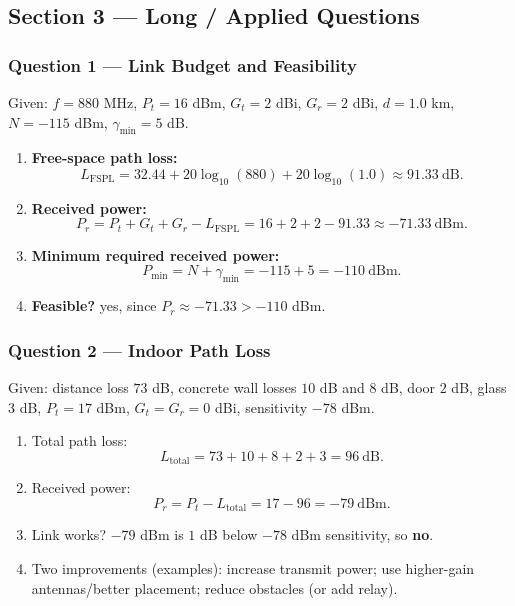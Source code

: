 \documentclass[11pt,a4paper]{article}
\begin{document}
\subsection*{Section 3 --- Long / Applied Questions}

\subsubsection*{Question 1 --- Link Budget and Feasibility}
Given: $f=880$ MHz, $P_t=16$ dBm, $G_t=2$ dBi, $G_r=2$ dBi, $d=1.0$ km, $N=-115$ dBm, $\gamma_{\min}=5$ dB.

\begin{enumerate}[label=\alph*.]
    \item \textbf{Free-space path loss:}
    \[
    L_{\mathrm{FSPL}}=32.44+20\log_{10}(880)+20\log_{10}(1.0)\approx 91.33\ \mathrm{dB}.
    \]
    \item \textbf{Received power:}
    \[
    P_r=P_t+G_t+G_r-L_{\mathrm{FSPL}}=16+2+2-91.33\approx -71.33\ \mathrm{dBm}.
    \]
    \item \textbf{Minimum required received power:}
    \[
    P_{\min}=N+\gamma_{\min}=-115+5=-110\ \mathrm{dBm}.
    \]
    \item \textbf{Feasible?} yes, since $P_r\approx -71.33 > -110$ dBm.
    
\end{enumerate}

\subsubsection*{Question 2 --- Indoor Path Loss}
Given: distance loss $73$ dB, concrete wall losses $10$ dB and $8$ dB, door $2$ dB, glass $3$ dB, $P_t=17$ dBm, $G_t=G_r=0$ dBi, sensitivity $-78$ dBm.

\begin{enumerate}[label=\alph*.]
    \item Total path loss:
    \[
    L_{\text{total}}=73+10+8+2+3=96\ \mathrm{dB}.
    \]
    \item Received power:
    \[
    P_r=P_t-L_{\text{total}}=17-96=-79\ \mathrm{dBm}.
    \]
    \item Link works? $-79$ dBm is $1$ dB below $-78$ dBm sensitivity, so \textbf{no}.
    \item Two improvements (examples): increase transmit power; use higher-gain antennas/better placement; reduce obstacles (or add relay).
\end{enumerate}
\end{document}
